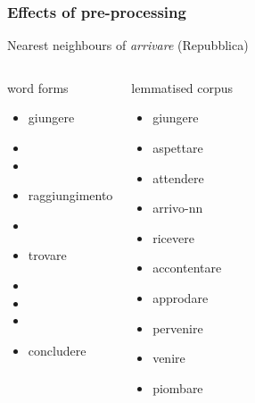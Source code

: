 \documentclass[t]{beamer} %
\begin{document}
\begin{frame}
  \frametitle{Effects of pre-processing}

  \centering
  Nearest neighbours of \emph{arrivare} (Repubblica)
  \footnotesize
  \begin{columns}[t]
    \column{4cm}
    \begin{block}{word forms}
      \begin{itemize}
      \item  giungere
      \item  {}
      \item  {}
      \item  raggiungimento
      \item  {}
      \item  trovare
      \item  {}
      \item  {}
      \item  {}
      \item  concludere
      \end{itemize}
    \end{block}
    \column{4cm}
    \begin{block}{lemmatised corpus}
      \begin{itemize}
      \item giungere
      \item aspettare
      \item attendere
      \item arrivo-nn
      \item ricevere
      \item accontentare
      \item approdare
      \item pervenire
      \item venire
      \item piombare
      \end{itemize}
    \end{block}
  \end{columns}
\end{frame}
\end{document}
